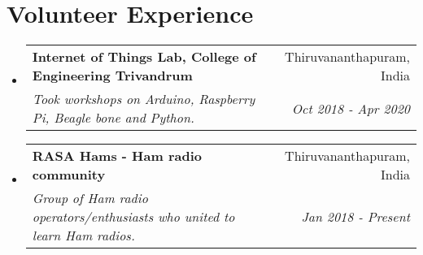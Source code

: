 \documentclass[a4paper,20pt]{article}
\makeatletter
\newcommand{\resumeSubheading}[4]{
	\vspace{-1pt}\item
	\begin{tabular*}{0.97\textwidth}{l@{\extracolsep{\fill}}r}
	\textbf{#1} & #2 \\
	\textit{#3} & \textit{#4} \\
	\end{tabular*}\vspace{-5pt}
}
\newcommand{\resumeSubHeadingListStart}{\begin{itemize}[leftmargin=*]}
\newcommand{\resumeSubHeadingListEnd}{\end{itemize}}
\makeatother
\begin{document}
\vspace{-5pt}
\section{Volunteer Experience}
	\resumeSubHeadingListStart
		\resumeSubheading
			{Internet of Things Lab, College of Engineering Trivandrum}{Thiruvananthapuram, India}
			{Took workshops on Arduino, Raspberry Pi, Beagle bone and Python.}{Oct 2018 - Apr 2020}
			
		\vspace{5pt}
    		\resumeSubheading
			{RASA Hams - Ham radio community}{Thiruvananthapuram, India}
			{Group of Ham radio operators/enthusiasts who united to learn Ham radios.}{Jan 2018 - Present}
	\resumeSubHeadingListEnd
\end{document}
